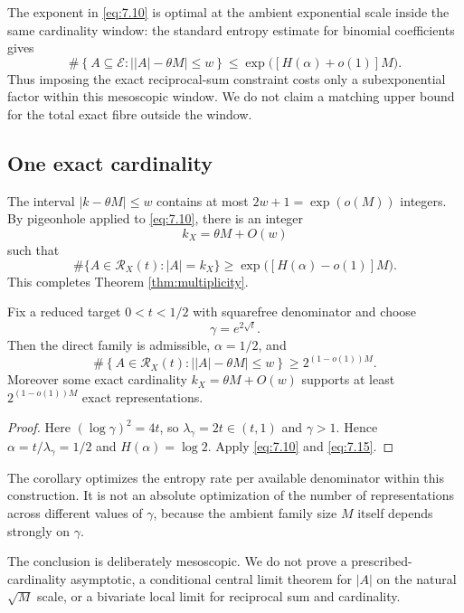 The exponent in \eqref{eq:7.10} is optimal at the ambient exponential scale inside the same cardinality window: the standard entropy estimate for binomial coefficients gives
\[
\#\left\{A\subseteq\mathcal E:
\bigl||A|-\theta M\bigr|\le w\right\}
\le
\exp\bigl([H(\alpha)+o(1)]M\bigr).
\tag{7.13}\label{eq:7.13}
\]
Thus imposing the exact reciprocal-sum constraint costs only a subexponential factor within this mesoscopic window. We do not claim a matching upper bound for the total exact fibre outside the window.

\subsection{One exact cardinality}

The interval $|k-\theta M|\le w$ contains at most $2w+1=\exp(o(M))$ integers. By pigeonhole applied to \eqref{eq:7.10}, there is an integer
\[
k_X=\theta M+O(w)
\tag{7.14}\label{eq:7.14}
\]
such that
\[
\#\{A\in\mathcal R_X(t):|A|=k_X\}
\ge
\exp\bigl([H(\alpha)-o(1)]M\bigr).
\tag{7.15}\label{eq:7.15}
\]
This completes Theorem \ref{thm:multiplicity}.

\begin{corollary}\label{cor:entropy-saturation}
Fix a reduced target $0<t<1/2$ with squarefree denominator and choose
\[
\gamma=e^{2\sqrt t}.
\]
Then the direct family is admissible, $\alpha=1/2$, and
\[
\#\left\{A\in\mathcal R_X(t):
\bigl||A|-\theta M\bigr|\le w\right\}
\ge 2^{(1-o(1))M}.
\]
Moreover some exact cardinality $k_X=\theta M+O(w)$ supports at least $2^{(1-o(1))M}$ exact representations.
\end{corollary}

\begin{proof}
Here $(\log\gamma)^2=4t$, so $\lambda_\gamma=2t\in(t,1)$ and $\gamma>1$. Hence $\alpha=t/\lambda_\gamma=1/2$ and $H(\alpha)=\log2$. Apply \eqref{eq:7.10} and \eqref{eq:7.15}.
\end{proof}

The corollary optimizes the entropy rate per available denominator within this construction. It is not an absolute optimization of the number of representations across different values of $\gamma$, because the ambient family size $M$ itself depends strongly on $\gamma$.

The conclusion is deliberately mesoscopic. We do not prove a prescribed-cardinality asymptotic, a conditional central limit theorem for $|A|$ on the natural $\sqrt M$ scale, or a bivariate local limit for reciprocal sum and cardinality.